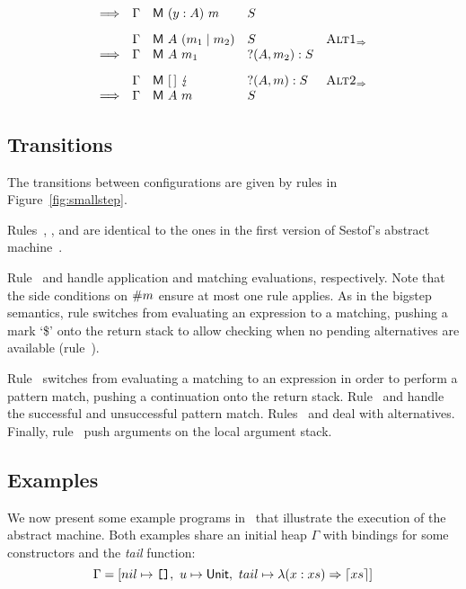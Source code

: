 \begin{figure*}
\[\begin{array}{rllll}
      \Longrightarrow & \Gamma & \textsf{M}~(y:A)~m  & S \\[2ex]
      & \Gamma & \textsf{M}~A~(m_1 \mid m_2) & S & \textsc{Alt1}_{\Rightarrow} \\
      \Longrightarrow & \Gamma & \textsf{M}~A~m_1   &?(A,m_2):S & \\[2ex]
  & \Gamma & \textsf{M}~[\,]~\lightning  & ?(A,m):S & \textsc{Alt2}_{\Rightarrow} \\
  \Longrightarrow & \Gamma & \textsf{M}~A~m  & S 
    \end{array}
  \]
    
  
  \caption{Abstract machine transition rules}\label{fig:smallstep}
\end{figure*}

\subsection{Transitions}

The transitions between configurations are given by rules in
Figure~\ref{fig:smallstep}.

Rules~, , 
and  are identical to the ones in the first version of
Sestof's abstract machine~\cite{sestof_1997}.

Rule~ and  handle application
and matching evaluations, respectively. Note that the
side conditions on $\#{m}$ ensure at most one
rule applies.
As in the bigstep semantics, rule  switches
from evaluating an expression to a
matching, pushing a mark `\$' onto the return stack
to allow checking when no pending alternatives
are available (rule~).

Rule~ switches from evaluating a matching
to an expression in order to perform a pattern match, pushing
a continuation onto the return stack.
Rule~ and  handle
the successful and unsuccessful pattern match.
Rules~ and  deal
with alternatives.
Finally, rule~ push arguments on the local argument stack.

\subsection{Examples}

We now present some example programs in \lambdaPMC\ that illustrate
the execution of the abstract machine.  Both examples share an
initial heap $\Gamma$ with bindings for some constructors
and the \textit{tail} function:
\[
  \Gamma = [ nil \mapsto \texttt{[]},\ u \mapsto \textsf{Unit},\ tail \mapsto \lambda(x : xs) \Rightarrow \left\lceil xs\right\rceil ]
\]

